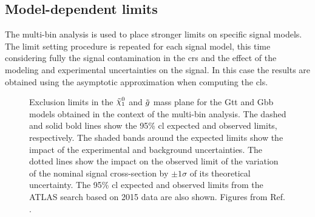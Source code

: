 \subsection{Model-dependent limits}

The multi-bin analysis is used to place stronger limits on specific signal models. 
The limit setting procedure is repeated for each signal model, this time considering fully the signal contamination in the 
\glspl{cr} and the effect of the modeling and experimental uncertainties on the signal. 
In this case the results are obtained using the asymptotic approximation \cite{Cowan2011} when computing the \gls{cls}.


\begin{figure}[htbp]
	\centering 
	\caption{Exclusion limits in the $\ninoone$ and $\tilde{g}$ mass plane
  		for the  Gtt and   Gbb models obtained
		in the context of the multi-bin analysis. The dashed and solid bold lines
		show the 95\% \gls{cl} expected and observed limits, respectively. The
  		shaded bands around the expected limits show the
                impact of the
  		experimental and background uncertainties. The dotted
  		lines show the impact on the observed limit of the variation of the
  		nominal signal cross-section by $\pm 1 \sigma$ of its theoretical
  		uncertainty. 
		The 95\% \gls{cl} expected and observed limits from the ATLAS search based on 2015 data 
  		\cite{Aad:2016eki} are also shown.  Figures from Ref. \cite{Aaboud:2017hrg}.}
	\label{fig:limits_GbbGtt}
\end{figure}

